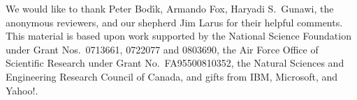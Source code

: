 \acks
We would like to thank Peter Bod\'{\i}k, Armando Fox, Haryadi S.\ Gunawi, the anonymous
reviewers, and our shepherd Jim Larus for their helpful comments. This material
is based upon work supported by the National Science Foundation under Grant
Nos.\ 0713661, 0722077 and 0803690, the Air Force Office of Scientific Research
under Grant No.\ FA95500810352, the Natural Sciences and Engineering Research
Council of Canada, and gifts from IBM, Microsoft, and Yahoo!.
